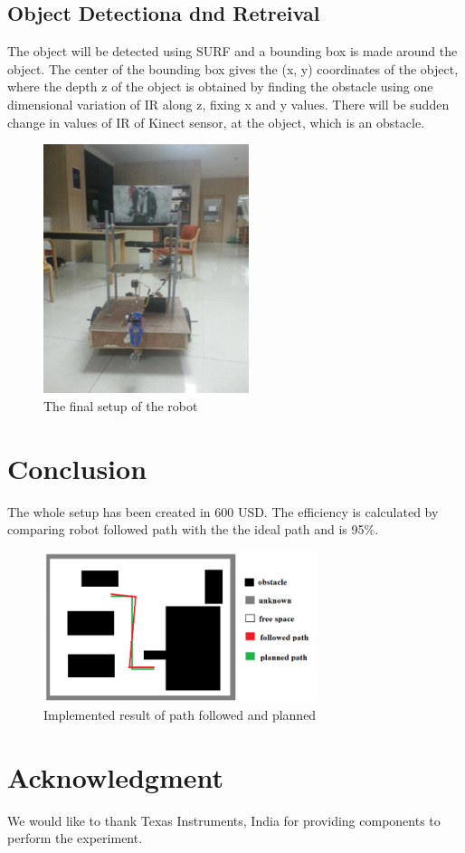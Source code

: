 \documentclass[conference]{IEEEtran}
\begin{document}
\subsection{Object Detectiona dnd Retreival}
 The object will be detected using SURF and a bounding box is made around the object. The center of the bounding box gives the (x, y) coordinates of the object, where the depth z of the object is obtained by finding the obstacle using one dimensional variation of IR along z, fixing x and y values. There will be sudden change in values of IR of Kinect sensor, at the object, which is an obstacle.
\begin{figure}[h]
\includegraphics[width=6cm]{robotsetup.png}
\centering
\caption{The final setup of the robot}\label{net_img}
\end{figure}

\section{Conclusion}
The whole setup has been created in 600 USD. The efficiency is calculated by comparing  robot followed path with the the ideal path and is 95\%. 
\begin{figure}[h]
\includegraphics[width=8cm]{implementedresult.png}
\centering
\caption{Implemented result of path followed and planned}\label{net_img}
\end{figure}
\section*{Acknowledgment}
We would like to thank Texas Instruments, India for providing components to perform the experiment.
\end{document}
